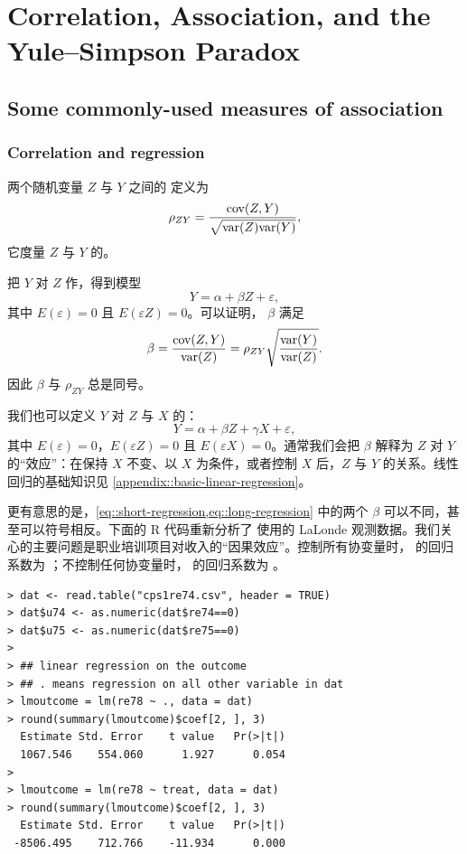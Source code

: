 \chapter{Correlation, Association, and the Yule--Simpson Paradox}
\label{chapter::correlationassociation}

\section{Some commonly-used measures of association}

\subsection{Correlation and regression}
\label{section:correlatioandregressionintro}

两个随机变量 $Z$ 与 $Y$ 之间的  定义为
\[
\rho_{ZY}
= \frac{\textup{cov}(Z,Y)}{\sqrt{\textup{var}(Z)\textup{var}(Y)}} ,
\]
它度量 $Z$ 与 $Y$ 的。

把 $Y$ 对 $Z$ 作，得到模型
\begin{equation}
Y = \alpha + \beta Z + \varepsilon ,
\label{eq::short-regression}
\end{equation}
其中 $E(\varepsilon)=0$ 且 $E(\varepsilon Z)=0$。可以证明， $\beta$ 满足
\[
\beta
= \frac{\textup{cov}(Z,Y)}{\textup{var}(Z)}
= \rho_{ZY}\sqrt{\frac{\textup{var}(Y)}{\textup{var}(Z)}} .
\]
因此 $\beta$ 与 $\rho_{ZY}$ 总是同号。

我们也可以定义 $Y$ 对 $Z$ 与 $X$ 的：
\begin{equation}
Y = \alpha + \beta Z + \gamma X + \varepsilon ,
\label{eq::long-regression}
\end{equation}
其中 $E(\varepsilon)=0$，$E(\varepsilon Z)=0$ 且 $E(\varepsilon X)=0$。通常我们会把 $\beta$ 解释为 $Z$ 对 $Y$ 的“效应”：在保持 $X$ 不变、以 $X$ 为条件，或者控制 $X$ 后，$Z$ 与 $Y$ 的关系。线性回归的基础知识见 \cref{appendix::basic-linear-regression}。

更有意思的是，\cref{eq::short-regression,eq::long-regression} 中的两个 $\beta$ 可以不同，甚至可以符号相反。下面的 R 代码重新分析了 \citet{hainmueller2012entropy} 使用的 LaLonde 观测数据。我们关心的主要问题是职业培训项目对收入的“因果效应”。控制所有协变量时， 的回归系数为 ；不控制任何协变量时， 的回归系数为 。

\begin{lstlisting}
> dat <- read.table("cps1re74.csv", header = TRUE)
> dat$u74 <- as.numeric(dat$re74==0)
> dat$u75 <- as.numeric(dat$re75==0)
>
> ## linear regression on the outcome
> ## . means regression on all other variable in dat
> lmoutcome = lm(re78 ~ ., data = dat)
> round(summary(lmoutcome)$coef[2, ], 3)
  Estimate Std. Error    t value   Pr(>|t|)
  1067.546    554.060      1.927      0.054
>
> lmoutcome = lm(re78 ~ treat, data = dat)
> round(summary(lmoutcome)$coef[2, ], 3)
  Estimate Std. Error    t value   Pr(>|t|)
 -8506.495    712.766    -11.934      0.000
\end{lstlisting}

